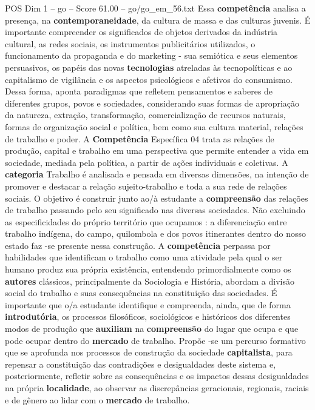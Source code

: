 \begin{textsample}{POS Dim 1 – go – Score 61.00 – go/go\_em\_56.txt}
Essa \textbf{competência} analisa a presença, na \textbf{contemporaneidade}, da cultura de massa e das culturas juvenis.
É importante compreender os significados de objetos derivados da indústria cultural, as redes sociais, os instrumentos publicitários utilizados, o funcionamento da propaganda e do marketing - sua semiótica e seus elementos persuasivos, os papéis das novas \textbf{tecnologias} atreladas às tecnopolíticas e ao capitalismo de vigilância e os aspectos psicológicos e afetivos do consumismo.
Dessa forma, aponta paradigmas que refletem pensamentos e saberes de diferentes grupos, povos e sociedades, considerando suas formas de apropriação da natureza, extração, transformação, comercialização de recursos naturais, formas de organização social e política, bem como sua cultura material, relações de trabalho e poder.
A \textbf{Competência} Específica 04 trata as relações de produção, capital e trabalho em uma perspectiva que permite entender a vida em sociedade, mediada pela política, a partir de ações individuais e coletivas.
A \textbf{categoria} Trabalho é analisada e pensada em diversas dimensões, na intenção de promover e destacar a relação sujeito-trabalho e toda a sua rede de relações sociais.
O objetivo é construir junto ao/à estudante a \textbf{compreensão} das relações de trabalho passando pelo seu significado nas diversas sociedades.
Não excluindo as especificidades do próprio território que ocupamos : a diferenciação entre trabalho indígena, do campo, quilombola e dos povos itinerantes dentro do nosso estado faz -se presente nessa construção.
A \textbf{competência} perpassa por habilidades que identificam o trabalho como uma atividade pela qual o ser humano produz sua própria existência, entendendo primordialmente como os \textbf{autores} clássicos, principalmente da Sociologia e História, abordam a divisão social do trabalho e suas consequências na constituição das sociedades.
É importante que o/a estudante identifique e compreenda, ainda, que de forma \textbf{introdutória}, os processos filosóficos, sociológicos e históricos dos diferentes modos de produção que \textbf{auxiliam} na \textbf{compreensão} do lugar que ocupa e que pode ocupar dentro do \textbf{mercado} de trabalho.
Propõe -se um percurso formativo que se aprofunda nos processos de construção da sociedade \textbf{capitalista}, para repensar a constituição das contradições e desigualdades deste sistema e, posteriormente, refletir sobre as consequências e os impactos dessas desigualdades na própria \textbf{localidade}, ao observar as discrepâncias geracionais, regionais, raciais e de gênero ao lidar com o \textbf{mercado} de trabalho.

\end{textsample}
